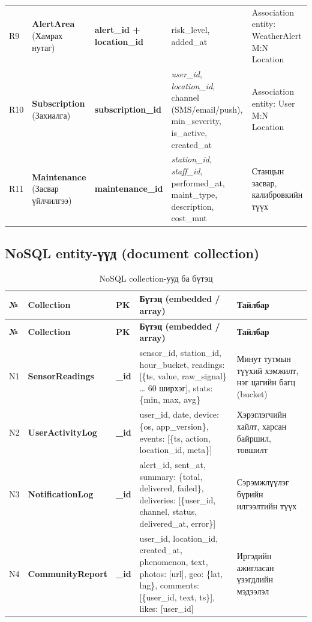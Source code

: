 \documentclass[12pt,a4paper]{article}
\newcommand{\pk}[1]{\textbf{#1}}
\begin{document}
{\begin{longtable}{C{0.7cm}L{2.8cm}L{2.7cm}L{4.9cm}L{3.8cm}}
R9 & \textbf{AlertArea} (Хамрах нутаг) & \pk{alert\_id + location\_id} & risk\_level, added\_at & Association entity: WeatherAlert M:N Location\\
R10 & \textbf{Subscription} (Захиалга) & \pk{subscription\_\allowbreak id} & \textit{user\_id}, \textit{location\_id}, channel (SMS/email/push), min\_severity, is\_active, created\_at & Association entity: User M:N Location\\
R11 & \textbf{Maintenance} (Засвар үйлчилгээ) & \pk{maintenance\_\allowbreak id} & \textit{station\_id}, \textit{staff\_id}, performed\_at, maint\_type, description, cost\_mnt & Станцын засвар, калибровкийн түүх\\
\end{longtable}
}

\subsection{NoSQL entity-үүд (document collection)}
{\small
\setlength{\tabcolsep}{4pt}
\begin{longtable}{C{0.7cm}L{3.0cm}L{1.1cm}L{6.0cm}L{4.1cm}}
\caption{NoSQL collection-ууд ба бүтэц}\label{tab:nosql}\\
\toprule
\textbf{№} & \textbf{Collection} & \textbf{PK} & \textbf{Бүтэц (embedded / array)} & \textbf{Тайлбар}\\
\midrule
\endfirsthead
\toprule
\textbf{№} & \textbf{Collection} & \textbf{PK} & \textbf{Бүтэц (embedded / array)} & \textbf{Тайлбар}\\
\midrule
\endhead
\bottomrule
\endfoot
N1 & \textbf{SensorReadings} & \pk{\_id} & sensor\_id, station\_id, hour\_bucket, readings: [\{ts, value, raw\_signal\} … 60 ширхэг], stats: \{min, max, avg\} & Минут тутмын түүхий хэмжилт, нэг цагийн багц (bucket)\\
N2 & \textbf{UserActivityLog} & \pk{\_id} & user\_id, date, device: \{os, app\_version\}, events: [\{ts, action, location\_id, meta\}] & Хэрэглэгчийн хайлт, харсан байршил, товшилт\\
N3 & \textbf{NotificationLog} & \pk{\_id} & alert\_id, sent\_at, summary: \{total, delivered, failed\}, deliveries: [\{user\_id, channel, status, delivered\_at, error\}] & Сэрэмжлүүлэг бүрийн илгээлтийн түүх\\
N4 & \textbf{CommunityReport} & \pk{\_id} & user\_id, location\_id, created\_at, phenomenon, text, photos: [url], geo: \{lat, lng\}, comments: [\{user\_id, text, ts\}], likes: [user\_id] & Иргэдийн ажигласан үзэгдлийн мэдээлэл\\
\end{longtable}
}
\end{document}
